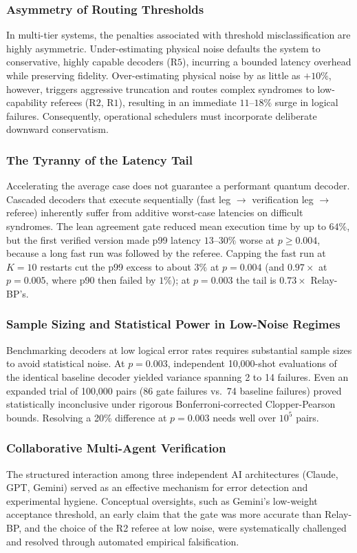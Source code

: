 \subsubsection{Asymmetry of Routing Thresholds}
In multi-tier systems, the penalties associated with threshold misclassification are highly asymmetric. Under-estimating physical noise defaults the system to conservative, highly capable decoders ($\text{R5}$), incurring a bounded latency overhead while preserving fidelity. Over-estimating physical noise by as little as $+10\%$, however, triggers aggressive truncation and routes complex syndromes to low-capability referees ($\text{R2}$, $\text{R1}$), resulting in an immediate $11\text{--}18\%$ surge in logical failures. Consequently, operational schedulers must incorporate deliberate downward conservatism.

\subsubsection{The Tyranny of the Latency Tail}
Accelerating the average case does not guarantee a performant quantum decoder. Cascaded decoders that execute sequentially (fast leg $\to$ verification leg $\to$ referee) inherently suffer from additive worst-case latencies on difficult syndromes. The lean agreement gate reduced mean execution time by up to $64\%$, but the first verified version made p99 latency $13\text{--}30\%$ worse at $p \ge 0.004$, because a long fast run was followed by the referee. Capping the fast run at $K=10$ restarts cut the p99 excess to about $3\%$ at $p=0.004$ (and $0.97\times$ at $p=0.005$, where p90 then failed by $1\%$); at $p=0.003$ the tail is $0.73\times$ Relay-BP's.

\subsubsection{Sample Sizing and Statistical Power in Low-Noise Regimes}
Benchmarking decoders at low logical error rates requires substantial sample sizes to avoid statistical noise. At $p = 0.003$, independent 10,000-shot evaluations of the identical baseline decoder yielded variance spanning 2 to 14 failures. Even an expanded trial of 100,000 pairs (86 gate failures vs.\ 74 baseline failures) proved statistically inconclusive under rigorous Bonferroni-corrected Clopper-Pearson bounds. Resolving a 20\% difference at $p=0.003$ needs well over $10^5$ pairs.

\subsubsection{Collaborative Multi-Agent Verification}
The structured interaction among three independent AI architectures (Claude, GPT, Gemini) served as an effective mechanism for error detection and experimental hygiene. Conceptual oversights, such as Gemini's low-weight acceptance threshold, an early claim that the gate was more accurate than Relay-BP, and the choice of the R2 referee at low noise, were systematically challenged and resolved through automated empirical falsification.

